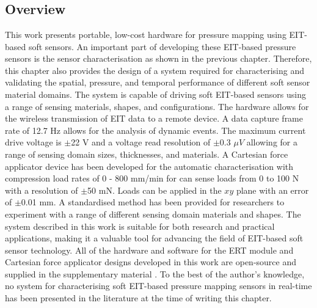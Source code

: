 \chapter{\chapvname}
\label{chapter5}
\section*{Overview}
This work presents portable, low-cost hardware for pressure mapping using EIT-based soft sensors. An important part of developing these EIT-based pressure sensors is the sensor characterisation as shown in the previous chapter. Therefore, this chapter also provides the design of a system required for characterising and validating the spatial, pressure, and temporal performance of different soft sensor material domains. The system is capable of driving soft EIT-based sensors using a range of sensing materials, shapes, and configurations. The hardware allows for the wireless transmission of EIT data to a remote device. 
A data capture frame rate of 12.7 Hz allows for the analysis of dynamic events. The maximum current drive voltage is $\pm$22 V and a voltage read resolution of $\pm$0.3 $\mu V$ allowing for a range of sensing domain sizes, thicknesses, and materials. A Cartesian force applicator device has been developed for the automatic characterisation with compression load rates of 0 - 800 mm/min for can sense loads from 0 to 100 N with a resolution of $\pm$50 mN. Loads can be applied in the $xy$ plane with an error of $\pm$0.01 mm. A standardised method has been provided for researchers to experiment with a range of different sensing domain materials and shapes. The system described in this work is suitable for both research and practical applications, making it a valuable tool for advancing the field of EIT-based soft sensor technology. All of the hardware and software for the ERT module and Cartesian force applicator designs developed in this work are open-source and supplied in the supplementary material \cite{Ellingham2025}. 
To the best of the author's knowledge, no system for characterising soft EIT-based pressure mapping sensors in real-time has been presented in the literature at the time of writing this chapter.



